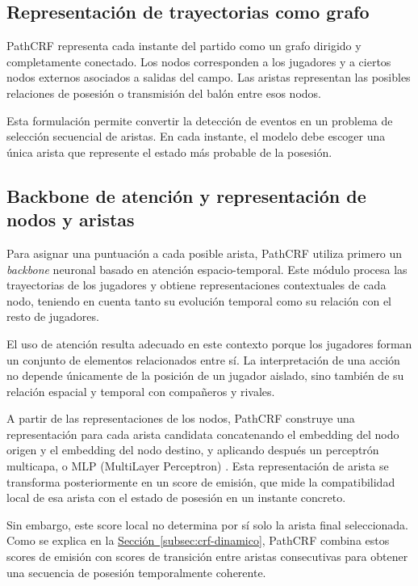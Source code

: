 \subsection{Representación de trayectorias como grafo}
\label{subsec:repr-grafo-pathcrf}

PathCRF representa cada instante del partido como un grafo dirigido y completamente conectado. Los nodos corresponden a los jugadores y a ciertos nodos externos asociados a salidas del campo. Las aristas representan las posibles relaciones de posesión o transmisión del balón entre esos nodos.

Esta formulación permite convertir la detección de eventos en un problema de selección secuencial de aristas. En cada instante, el modelo debe escoger una única arista que represente el estado más probable de la posesión. 

\subsection{Backbone de atención y representación de nodos y aristas}

Para asignar una puntuación a cada posible arista, PathCRF utiliza primero un \textit{backbone} neuronal basado en atención espacio-temporal. Este módulo procesa las trayectorias de los jugadores y obtiene representaciones contextuales de cada nodo, teniendo en cuenta tanto su evolución temporal como su relación con el resto de jugadores.

El uso de atención resulta adecuado en este contexto porque los jugadores forman un conjunto de elementos relacionados entre sí. La interpretación de una acción no depende únicamente de la posición de un jugador aislado, sino también de su relación espacial y temporal con compañeros y rivales.

A partir de las representaciones de los nodos, PathCRF construye una representación para cada arista candidata concatenando el embedding del nodo origen y el embedding del nodo destino, y aplicando después un perceptrón multicapa, o MLP (MultiLayer Perceptron) \citep{goodfellow2016deep}. Esta representación de arista se transforma posteriormente en un score de emisión, que mide la compatibilidad local de esa arista con el estado de posesión en un instante concreto.

Sin embargo, este score local no determina por sí solo la arista final seleccionada. Como se explica en la \hyperref[subsec:crf-dinamico]{Sección~\ref*{subsec:crf-dinamico}}, PathCRF combina estos scores de emisión con scores de transición entre aristas consecutivas para obtener una secuencia de posesión temporalmente coherente.

